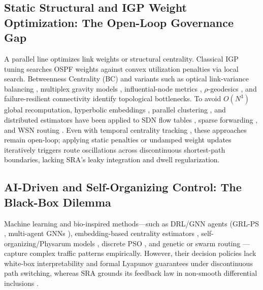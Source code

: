 \documentclass{ccjnl}
\newcommand{\rev}[1]{{\color{blue}#1}}
\def\rev#1{#1}%
\begin{document}
\subsection{Static Structural \rev{and IGP Weight} Optimization: The Open-Loop Governance Gap}

A parallel line optimizes \rev{link weights \cite{Fortz2000OSPF} or} structural centrality. \rev{Classical IGP tuning \cite{Fortz2000OSPF} searches OSPF weights against convex utilization penalties via local search.} Betweenness Centrality (BC) \cite{Brandes2001Faster} and variants such as optical link-variance balancing \cite{Upadhyay2024OpticalBC}, multiplex gravity models \cite{Ni2023Gravity}, influential-node metrics \cite{Basaras2019Influential, Wehmuth2021SpuriousPaths}, $\rho$-geodesics \cite{DeMedeiros2017QuasiShortest}, and failure-resilient connectivity \cite{Cavallaro2022Connectivity} identify topological bottlenecks. To avoid $O(N^3)$ global recomputation, hyperbolic embeddings \cite{Stai2017Hyperbolic}, parallel clustering \cite{Suppa2015FastBC}, and distributed estimators \cite{Maccari2020DistributedLoad, Maccari2018DistributedDV} have been applied to SDN flow tables \cite{Ma2019FlowTable}, sparse forwarding \cite{Ahmed2025SparseNet}, and WSN routing \cite{Oliveira2010WSNcentrality}. Even with temporal centrality tracking \cite{Ghanem2019DynamicCentrality}, these approaches remain open-loop; \rev{applying static penalties or undamped weight updates iteratively triggers route oscillations across discontinuous shortest-path boundaries, lacking SRA's leaky integration and dwell regularization.}

\subsection{AI-Driven and Self-Organizing Control: The Black-Box Dilemma}

Machine learning and bio-inspired methods—such as DRL/GNN agents (GRL-PS \cite{Wei2023GRLPS}, multi-agent GNNs \cite{Feng2025MultiAgentGNN}), embedding-based centrality estimators \cite{Mendonca2021ApproxCentrality}, self-organizing/Physarum models \cite{Cheng2010SelfOrganizingModel, Guo2010HybridSelfOrg, Li2014PhysarumMulticast}, discrete PSO \cite{Wang2019DPSO}, and genetic or swarm routing \cite{Mu2024CarrierSelfOrg, Lu2022MissileSwarm,ma2021credibility}—capture complex traffic patterns empirically. However, their decision policies lack white-box interpretability and formal Lyapunov guarantees under discontinuous path switching, whereas SRA grounds its feedback law in non-smooth differential inclusions \cite{Aubin1984Differential}.
\end{document}
